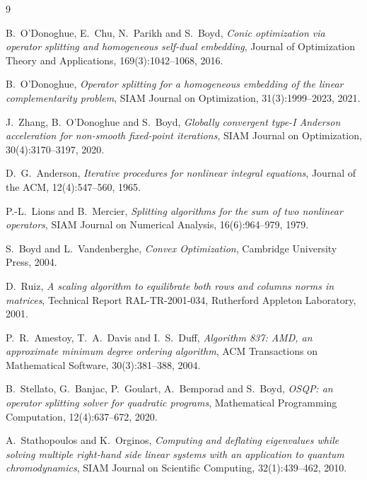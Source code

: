 \documentclass[11pt,a4paper]{article}
\theoremstyle{plain}
\begin{document}
\begin{thebibliography}{9}

B.~O'Donoghue, E.~Chu, N.~Parikh and S.~Boyd,
\emph{Conic optimization via operator splitting and homogeneous self-dual
embedding},
Journal of Optimization Theory and Applications, 169(3):1042--1068, 2016.

B.~O'Donoghue,
\emph{Operator splitting for a homogeneous embedding of the linear
complementarity problem},
SIAM Journal on Optimization, 31(3):1999--2023, 2021.

J.~Zhang, B.~O'Donoghue and S.~Boyd,
\emph{Globally convergent type-I Anderson acceleration for non-smooth
fixed-point iterations},
SIAM Journal on Optimization, 30(4):3170--3197, 2020.

D.~G.~Anderson,
\emph{Iterative procedures for nonlinear integral equations},
Journal of the ACM, 12(4):547--560, 1965.

P.-L.~Lions and B.~Mercier,
\emph{Splitting algorithms for the sum of two nonlinear operators},
SIAM Journal on Numerical Analysis, 16(6):964--979, 1979.

S.~Boyd and L.~Vandenberghe,
\emph{Convex Optimization},
Cambridge University Press, 2004.

D.~Ruiz,
\emph{A scaling algorithm to equilibrate both rows and columns norms in
matrices},
Technical Report RAL-TR-2001-034, Rutherford Appleton Laboratory, 2001.

P.~R.~Amestoy, T.~A.~Davis and I.~S.~Duff,
\emph{Algorithm 837: AMD, an approximate minimum degree ordering algorithm},
ACM Transactions on Mathematical Software, 30(3):381--388, 2004.

B.~Stellato, G.~Banjac, P.~Goulart, A.~Bemporad and S.~Boyd,
\emph{OSQP: an operator splitting solver for quadratic programs},
Mathematical Programming Computation, 12(4):637--672, 2020.

A.~Stathopoulos and K.~Orginos,
\emph{Computing and deflating eigenvalues while solving multiple right-hand
side linear systems with an application to quantum chromodynamics},
SIAM Journal on Scientific Computing, 32(1):439--462, 2010.

\end{thebibliography}
\end{document}
